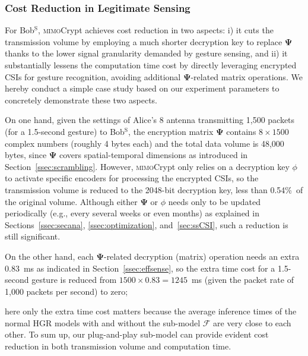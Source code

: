 \documentclass[conference,compsoc]{IEEEtran}
\newcommand{\sname}{\textsc{mimo}Crypt\xspace}
\newcommand{\rev}[1]{{\color{blue}#1}}      %
\newcommand{\newrev}[1]{{\color{blue}#1}}    %
\newcommand{\rev}[1]{#1}
\newcommand{\newrev}[1]{#1}
\begin{document}
\subsubsection{Cost Reduction in Legitimate Sensing}\label{sssec:timecost}
%
For Bob$^{\mathrm{S}}$, \sname achieves cost reduction in two aspects: i) it cuts the transmission volume by employing a much shorter decryption key to replace $\bm{\Psi}$ thanks to the lower signal granularity demanded by gesture sensing, and ii) it substantially lessens the computation time cost by directly leveraging encrypted CSIs for gesture recognition, avoiding additional $\bm{\Psi}$-related matrix operations. We hereby conduct a simple case study based on our experiment parameters to concretely demonstrate these two aspects.

\newrev{On one hand, given the settings of Alice's 8 antenna transmitting 1,500 packets (for a 1.5-second gesture) to Bob$^{\mathrm{S}}$, the encryption matrix $\bm{\Psi}$ contains $8 \times 1500$ complex numbers (roughly 4 bytes each) and the total data volume is 48,000 bytes, since $\bm{\Psi}$ covers spatial-temporal dimensions as
introduced in Section~\ref{ssec:scrambling}. However, \sname only relies on a decryption key $\phi$ to activate specific encoders for processing the encrypted CSIs, 
%
%
so the transmission volume is reduced to the 2048-bit decryption key, less than 0.54\%~of the original volume. Although either $\bm{\Psi}$ or $\phi$ needs only to be updated periodically (e.g., every several weeks or even months) as explained in Sections~\ref{ssec:secana}, \ref{ssec:optimization}, and~\ref{sec:ssCSI}, such a reduction is still significant.

On the other hand, each $\bm{\Psi}$-related decryption (matrix) operation 
needs an extra 0.83~\!ms as indicated in Section~\ref{ssec:effsense}, so the extra time cost for a 1.5-second gesture is reduced from $1500 \times 0.83 = 1245$~\!ms (given the packet rate of 1,000 packets per second) to zero;} here only the extra time cost matters because the average inference times of the normal HGR models with and without the sub-model $\mathcal{F}$ are very close to each other.
To sum up, our plug-and-play sub-model can provide evident cost reduction in both transmission volume and computation time.
\end{document}
